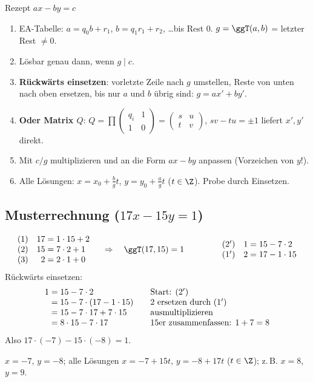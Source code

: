\begin{rezept}{Rezept $ax - by = c$}
\begin{enumerate}
\item EA-Tabelle: $a = q_0 b + r_1$, $b = q_1 r_1 + r_2$, \dots bis Rest 0. $g = \ggT(a, b)$ = letzter Rest $\ne 0$.
\item Lösbar genau dann, wenn $g \mid c$.
\item \textbf{Rückwärts einsetzen}: vorletzte Zeile nach $g$ umstellen, Reste von unten nach oben ersetzen, bis nur $a$ und $b$ übrig sind:
      $g = a x' + b y'$.
\item \textbf{Oder Matrix $Q$}: $Q = \prod \begin{pmatrix} q_i & 1\\ 1 & 0\end{pmatrix} = \begin{pmatrix} s & u\\ t & v\end{pmatrix}$,
      $sv - tu = \pm 1$ liefert $x', y'$ direkt.
\item Mit $c/g$ multiplizieren und an die Form $ax - by$ anpassen (Vorzeichen von $y$!).
\item Alle Lösungen: $x = x_0 + \frac{b}{g} t$, $y = y_0 + \frac{a}{g} t$ ($t \in \Z$). \quad Probe durch Einsetzen.
\end{enumerate}
\end{rezept}

\subsection*{Musterrechnung ($17x - 15y = 1$)}
\[
\begin{array}{lr@{\;=\;}l}
(1) & 17 & 1 \cdot 15 + 2\\
(2) & 15 & 7 \cdot 2 + 1\\
(3) & 2 & 2 \cdot 1 + 0
\end{array}
\quad\Rightarrow\quad \ggT(17, 15) = 1
\qquad\qquad
\begin{array}{lr@{\;=\;}l}
(2') & 1 & 15 - 7 \cdot 2\\
(1') & 2 & 17 - 1 \cdot 15
\end{array}
\]
Rückwärts einsetzen:
\[
\begin{array}{r@{\;}l@{\qquad}l}
1 &= 15 - 7 \cdot 2 & \text{Start: } (2')\\
  &= 15 - 7 \cdot (17 - 1 \cdot 15) & 2 \text{ ersetzen durch } (1')\\
  &= 15 - 7 \cdot 17 + 7 \cdot 15 & \text{ausmultiplizieren}\\
  &= 8 \cdot 15 - 7 \cdot 17 & 15\text{er zusammenfassen: } 1 + 7 = 8
\end{array}
\]
Also $17 \cdot (-7) - 15 \cdot (-8) = 1$.
\begin{ergebnis} $x = -7$, $y = -8$; alle Lösungen $x = -7 + 15t$, $y = -8 + 17t$ ($t \in \Z$); z.\,B. $x = 8$, $y = 9$. \end{ergebnis}
